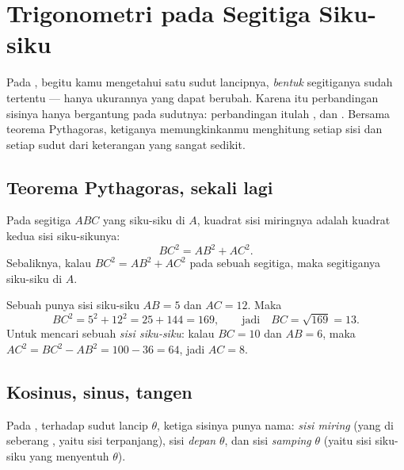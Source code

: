\chapter{Trigonometri pada Segitiga Siku-siku}\label{ch:g9:trig}

Pada , begitu kamu mengetahui satu sudut lancipnya,
\emph{bentuk} segitiganya sudah tertentu --- hanya ukurannya yang dapat
berubah. Karena itu perbandingan sisinya hanya bergantung pada
sudutnya: perbandingan itulah ,  dan
. Bersama teorema Pythagoras, ketiganya memungkinkanmu menghitung
setiap sisi dan setiap sudut  dari keterangan yang
sangat sedikit.

\section{Teorema Pythagoras, sekali lagi}

\begin{theorem}[Pythagoras]\label{thm:g9:trig:pythagoras}
Pada segitiga $ABC$ yang siku-siku di $A$, kuadrat sisi miringnya
adalah  kuadrat kedua sisi siku-sikunya:
\[
BC^2 = AB^2 + AC^2 .
\]
Sebaliknya, kalau $BC^2 = AB^2 + AC^2$ pada sebuah segitiga, maka
segitiganya siku-siku di $A$.
\end{theorem}
\admitted

\begin{example}\label{ex:g9:trig:pythagoras}
Sebuah  punya sisi siku-siku $AB = 5$ dan $AC = 12$. Maka
\[
BC^2 = 5^2 + 12^2 = 25 + 144 = 169,
\qquad\text{jadi}\quad BC = \sqrt{169} = 13 .
\]
Untuk mencari sebuah \emph{sisi siku-siku}: kalau $BC = 10$ dan
$AB = 6$, maka $AC^2 = BC^2 - AB^2 = 100 - 36 = 64$, jadi $AC = 8$.
\end{example}

\section{Kosinus, sinus, tangen}

Pada , terhadap sudut lancip $\theta$, ketiga sisinya
punya nama: \emph{sisi miring} (yang di seberang ,
yaitu sisi terpanjang), sisi \emph{depan} $\theta$, dan sisi
\emph{samping} $\theta$ (yaitu sisi siku-siku yang menyentuh $\theta$).

